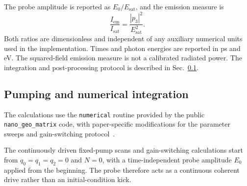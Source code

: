 \documentclass{optica-article}
\begin{document}

The probe amplitude is reported as $E_0/E_{\mathrm{sat}}$, and the emission measure is
\begin{equation}
\frac{I_{\mathrm{em}}}{I_{\mathrm{sat}}}
=\frac{|p_3|^2}{E_{\mathrm{sat}}^2}.
\end{equation}
Both ratios are dimensionless and independent of any auxiliary numerical units used in the implementation. Times and photon energies are reported in ps and eV. The squared-field emission measure is not a calibrated radiated power. The integration and post-processing protocol is described in Sec.~\ref{sec:numerical_protocol}.

\subsection{Pumping and numerical integration}
\label{sec:numerical_protocol}

The calculations use the \texttt{numerical} routine provided by the public \texttt{nano\_geo\_matrix} code, with paper-specific modifications for the parameter sweeps and gain-switching protocol~\cite{NanoGeoMatrix:2026}.

The continuously driven fixed-pump scans and gain-switching calculations start from $q_0=q_1=q_2=0$ and $N=0$, with a time-independent probe amplitude $E_0$ applied from the beginning. The probe therefore acts as a continuous coherent drive rather than an initial-condition kick.

\end{document}
